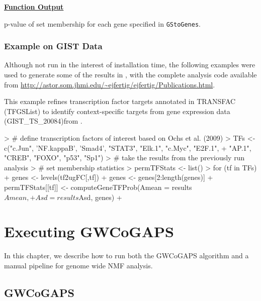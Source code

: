\documentclass{report}
\begin{document}
\par \noindent \textbf{\underline{Function Output}}
\begin{description}
\item p-value of set membership for each gene specified in \texttt{GStoGenes}.
\end{description}

\subsection{Example on GIST Data}

\par Although not run in the interest of installation time, the following examples were used to generate some of the results in \cite{Fertig2012}, with the complete analysis code available from \url{http://astor.som.jhmi.edu/~ejfertig/ejfertig/Publications.html}.

\par This example refines transcription factor targets annotated in TRANSFAC (TFGSList) to identify context-specific targets from gene expression data (GIST\_TS\_20084)from \cite{Ochs2009}.

\begin{Schunk}
\begin{Sinput}
> # define transcription factors of interest based on Ochs et al. (2009)
> TFs <- c("c.Jun", 'NF.kappaB', 'Smad4', "STAT3", "Elk.1", "c.Myc", "E2F.1",
+          "AP.1", "CREB", "FOXO", "p53", "Sp1")
> # take the results from the previously run analysis
> # set membership statistics
> permTFStats <- list()
> for (tf in TFs) {
+      genes <- levels(tf2ugFC[,tf])
+      genes <- genes[2:length(genes)]
+      permTFStats[[tf]] <- computeGeneTFProb(Amean = results$Amean,
+                                             Asd = results$Asd, genes)
+ }
\end{Sinput}
\end{Schunk}


\chapter{Executing GWCoGAPS}

\par In this chapter, we describe how to run both the GWCoGAPS algorithm and a manual pipeline for genome wide NMF analysis.

\section{GWCoGAPS} \label{GWCoGAPS}
\end{document}

